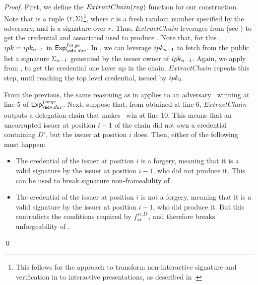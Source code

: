 \begin{proof}
  First, we define the $ExtractChain(reg)$ function for our construction.
  Note that \utrans is a tuple $(r,\Sigma)$\footnote{This follows for the approach
    to transform non-interactive signature and verification in \UAS to
    interactive presentations, as described in .}, where
  $r$ is a fresh random number specified by the adversary,
  and \Sig is a \CUASGen signature over $r$. Thus, $ExtractChain$ leverages
  \ExtractSign from \CUASGen (see ) to get the
  credential and associated \ipk used to produce \Sig. Note that, for this
  \ipk, $ipk = ipk_{n-1}$ in $\Exp^{forge}_{\adv,dac}$. In \CUASDAC, we can
  leverage $ipk_{n-1}$ to fetch from the public list a signature $\Sigma_{n-1}$
  generated by the issuer owner of $ipk_{n-1}$. Again, we apply \ExtractSign
  from \CUASGen, to get the credential one layer up in the chain.
  $ExtractChain$ repeats this step, until reaching the top level credential,
  issued by $ipk_0$.

  From the previous, the same reasoning as in  applies
  to an adversary \adv~winning at line 5 of $\Exp^{forge}_{\adv,dac}$. Next,
  suppose that, from \utrans obtained at line 6, $ExtractChain$ outputs a
  delegation chain that makes \adv~win at line 10. This means that an
  uncorrupted issuer at position $i-1$ of the chain did not own a credential
  containing $D'$, but the issuer at position $i$ does. Then, either of the
  following must happen:

  \begin{itemize}
  \item The credential of the issuer at position $i$ is a forgery, meaning that
    it is a valid signature by the issuer at position $i-1$, who did not produce
    it. This can be used to break signature non-frameability of \CUASGenInt.
  \item The credential of the issuer at position $i$ is not a forgery, meaning
    that it is a valid signature by the issuer at position $i-1$, who did
    produce it. But this contradicts the conditions required by $f_{is}^{n,D}$,
    and therefore breaks unforgeability of \CUASGenInt.
  \end{itemize}
  \qed
\end{proof}

